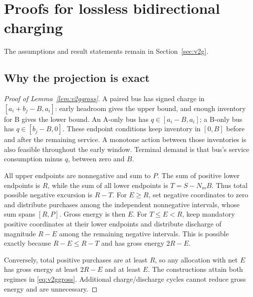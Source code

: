 \section{Proofs for lossless bidirectional charging}\label{app:v2g}
The assumptions and result statements remain in Section~\ref{sec:v2g}.

\subsection{Why the projection is exact}
\begin{proof}[Proof of Lemma~\ref{lem:v2ggross}]
A paired bus has signed charge in $[a_i+b_j-B,a_i]$: early headroom
gives the upper bound, and enough inventory for B gives the lower bound.
An A-only bus has $q\in[a_i-B,a_i]$; a B-only bus has
$q\in[b_j-B,0]$. These endpoint conditions keep inventory in $[0,B]$
before and after the remaining service. A monotone action between those
inventories is also feasible throughout the early window. Terminal demand
is that bus's service consumption minus $q$, between zero and $B$.

All upper endpoints are nonnegative and sum to $P$. The sum of positive
lower endpoints is $R$, while the sum of all lower endpoints is
$T=S-N_mB$. Thus total possible negative excursion is $R-T$. For
$E\ge R$, set negative coordinates to zero and distribute purchases
among the independent nonnegative intervals, whose sum spans $[R,P]$.
Gross energy is then $E$. For $T\le E<R$, keep mandatory positive
coordinates at their lower endpoints and distribute discharge of magnitude
$R-E$ among the remaining negative intervals. This is possible exactly
because $R-E\le R-T$ and has gross energy $2R-E$.

Conversely, total positive purchases are at least $R$, so any allocation
with net $E$ has gross energy at least $2R-E$ and at least $E$.
The constructions attain both regimes in \eqref{eq:v2ggross}. Additional
charge/discharge cycles cannot reduce gross energy and are unnecessary.
\end{proof}

